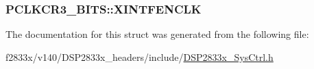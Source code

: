 \subsubsection[{X\+I\+N\+T\+F\+E\+N\+C\+L\+K}]{ P\+C\+L\+K\+C\+R3\+\_\+\+B\+I\+T\+S\+::\+X\+I\+N\+T\+F\+E\+N\+C\+L\+K}\label{struct_p_c_l_k_c_r3___b_i_t_s_a7893134f3d929355272de81842170ecf}


The documentation for this struct was generated from the following file\+:\begin{DoxyCompactItemize}
\item 
f2833x/v140/\+D\+S\+P2833x\+\_\+headers/include/\hyperlink{_d_s_p2833x___sys_ctrl_8h}{D\+S\+P2833x\+\_\+\+Sys\+Ctrl.\+h}\end{DoxyCompactItemize}
